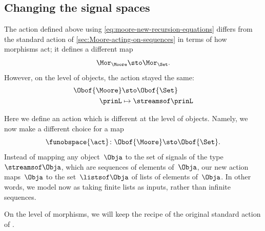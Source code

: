 
\subsection{Changing the signal spaces}

The action defined above using \cref{eq:moore-new-recursion-equations} differs from the standard action of \cref{sec:Moore-acting-on-sequences} in terms of how morphisms act; it defines a different map
\begin{equation}
    \Mor_\Moore \sto \Mor_\Set.
\end{equation}
However, on the level of objects, the action stayed the same:
\begin{equation}
    \begin{aligned}
        \Obof{\Moore} & \sto \Obof{\Set} \\
        \prinL        & \mapsto \streamsof\prinL
    \end{aligned}
\end{equation}

Here we define an action which is different at the level of objects.
Namely, we now make a different choice for a map
\begin{equation}
    \funobspace{\act} \colon \Obof{\Moore} \sto \Obof{\Set}.
\end{equation}
Instead of mapping any object~$\Obja$ to the set of signals of the type~$\streamsof\Obja$, which are sequences of elements of~$\Obja$, our new action maps~$\Obja$ to the set~$\listsof\Obja$ of lists of elements of~$\Obja$.
In other words, we model  now as taking finite lists as inputs, rather than infinite sequences.

On the level of morphisms, we will keep the recipe of the original standard action of .

